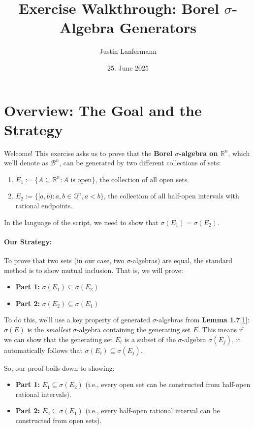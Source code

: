 \documentclass[11pt,a4paper]{article}
\title{Exercise Walkthrough: Borel $\sigma$-Algebra Generators}
\author{Justin Lanfermann}
\date{25. June 2025}
\theoremstyle{tutorstyle}
\begin{document}
\maketitle

\section*{Overview: The Goal and the Strategy}

Welcome! This exercise asks us to prove that the \textbf{Borel $\sigma$-algebra on $\mathbb{R}^n$}, which we'll denote as $\mathcal{B}^n$, can be generated by two different collections of sets:
\begin{enumerate}
    \item $E_1 := \{A \subseteq \mathbb{R}^n : A \text{ is open}\}$, the collection of all open sets.
    \item $E_2 := \{[a, b) : a, b \in \mathbb{Q}^n, a < b\}$, the collection of all half-open intervals with rational endpoints.
\end{enumerate}
In the language of the script, we need to show that $\sigma(E_1) = \sigma(E_2)$.

\paragraph{Our Strategy:}
To prove that two sets (in our case, two $\sigma$-algebras) are equal, the standard method is to show mutual inclusion. That is, we will prove:
\begin{itemize}
    \item \textbf{Part 1:} $\sigma(E_1) \subseteq \sigma(E_2)$
    \item \textbf{Part 2:} $\sigma(E_2) \subseteq \sigma(E_1)$
\end{itemize}
To do this, we'll use a key property of generated $\sigma$-algebras from \textbf{Lemma 1.7}\hyperlink{concept:generator}{[1]}: $\sigma(E)$ is the \textit{smallest} $\sigma$-algebra containing the generating set $E$. This means if we can show that the generating set $E_i$ is a subset of the $\sigma$-algebra $\sigma(E_j)$, it automatically follows that $\sigma(E_i) \subseteq \sigma(E_j)$.

So, our proof boils down to showing:
\begin{itemize}
    \item \textbf{Part 1:} $E_1 \subseteq \sigma(E_2)$ (i.e., every open set can be constructed from half-open rational intervals).
    \item \textbf{Part 2:} $E_2 \subseteq \sigma(E_1)$ (i.e., every half-open rational interval can be constructed from open sets).
\end{itemize}
\end{document}
